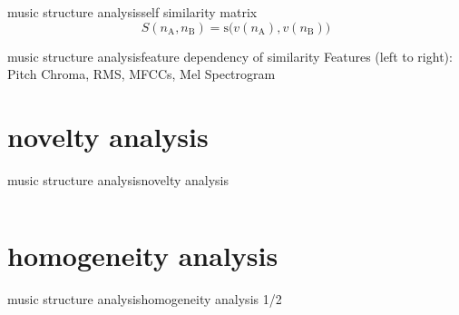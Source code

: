        \begin{frame}{music structure analysis}{self similarity matrix}
            \vspace{-2mm}
            \begin{equation*}
                S(n_\mathrm{A}, n_\mathrm{B}) = \mathrm{s}\big(v(n_\mathrm{A}),v(n_\mathrm{B})\big)
            \end{equation*}
            \vspace{-5mm}
            
        \end{frame}
        \begin{frame}{music structure analysis}{feature dependency of similarity}
            Features (left to right): Pitch Chroma, RMS, MFCCs, Mel Spectrogram
        \end{frame}
    \section[novelty]{novelty analysis}
        \begin{frame}{music structure analysis}{novelty analysis}
            \begin{columns}
            \end{columns}
        \end{frame}
    \section[homogeneity]{homogeneity analysis}
        \begin{frame}{music structure analysis}{homogeneity analysis 1/2}
        \end{frame}
        
